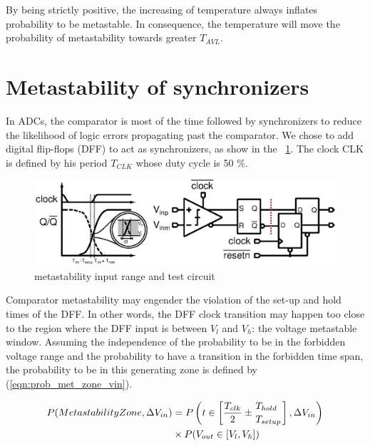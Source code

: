 By being strictly positive, the increasing of temperature always inflates probability to be metastable. In consequence, the temperature will move the probability of metastability towards greater $T_{AVL}$.

\section{Metastability of synchronizers}
In ADCs\@, the comparator is most of the time followed by synchronizers to reduce the likelihood of logic errors propagating past the comparator. We chose to add digital flip-flops (DFF) to act as synchronizers, as show in the \figurename~\ref{fig:metastable_rng}. The clock CLK is defined by his period $T_{CLK}$ whose duty cycle is 50 \%.

\begin{figure}[htp]
\centering
\includegraphics[width=\textwidth]{Appendix3/Figs/comp-metastability-window.ps}
\caption{metastability input range and test circuit}
\label{fig:metastable_rng}
\end{figure}

Comparator metastability may engender the violation of the set-up and hold times of the DFF\@. In other words, the DFF clock transition may happen too close to the region where the DFF input is between $V_{l}$ and $V_{h}$: the voltage metastable window. Assuming the independence of the probability to be in the forbidden voltage range and the probability to have a transition in the forbidden time span, the probability to be in this generating zone is defined by (\ref{eqn:prob_met_zone_vin}).

\begin{align}
P(Metastability Zone, \Delta V_{in}) &=
P\left(t \in \left[\frac{T_{clk}}{2} \pm \myatop{T_{hold}}{T_{setup}} \right], \Delta V_{in}\right) \nonumber \\
&\times P(V_{out} \in [V_l, V_h])
\label{eqn:prob_met_zone_vin}
\end{align}

